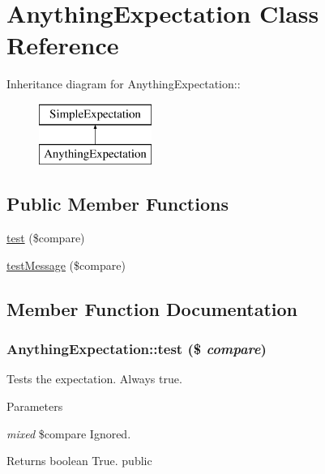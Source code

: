\hypertarget{class_anything_expectation}{
\section{AnythingExpectation Class Reference}
\label{class_anything_expectation}
}
Inheritance diagram for AnythingExpectation::\begin{figure}[H]
\begin{center}
\leavevmode
\includegraphics[height=2cm]{class_anything_expectation}
\end{center}
\end{figure}
\subsection*{Public Member Functions}
\begin{DoxyCompactItemize}
\item 
\hyperlink{class_anything_expectation_a770e43480dbda7ce6c9761b88ab980cd}{test} (\$compare)
\item 
\hyperlink{class_anything_expectation_aca28056e014baf523837ac281de6bea8}{testMessage} (\$compare)
\end{DoxyCompactItemize}


\subsection{Member Function Documentation}
\hypertarget{class_anything_expectation_a770e43480dbda7ce6c9761b88ab980cd}{
\subsubsection[{test}]{\setlength{\rightskip}{0pt plus 5cm}AnythingExpectation::test (\$ {\em compare})}}
\label{class_anything_expectation_a770e43480dbda7ce6c9761b88ab980cd}
Tests the expectation. Always true. 
\begin{DoxyParams}{Parameters}
\item[{\em mixed}]\$compare Ignored. \end{DoxyParams}
\begin{DoxyReturn}{Returns}
boolean True.  public 
\end{DoxyReturn}


